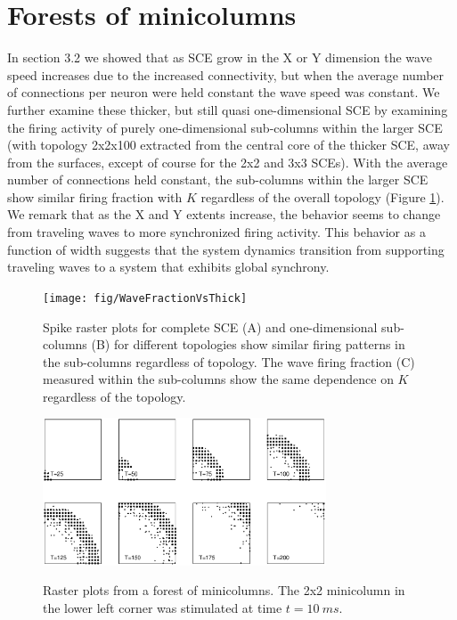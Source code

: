 \FloatBarrier
\section{Forests of minicolumns}
In section 3.2 we showed that as SCE grow in the X or Y dimension the wave speed increases due to the increased connectivity, but when the average number of connections per neuron were held constant the wave speed was constant.
We further examine these thicker, but still quasi one-dimensional SCE by examining the firing activity of purely one-dimensional sub-columns within the larger SCE (with topology 2x2x100 extracted from the central core of the thicker SCE, away from the surfaces, except of course for the 2x2 and 3x3 SCEs).
With the average number of connections held constant, the sub-columns within the larger SCE show similar firing fraction with $K$ regardless of the overall topology (Figure \ref{fig:LargeSCESubcolumns}).
We remark that as the X and Y extents increase, the behavior seems to change from traveling waves to more synchronized firing activity.
This behavior as a function of width suggests that the system dynamics transition from supporting traveling waves to a system that exhibits global synchrony.
\begin{figure}[!htb]
 \caption{ Spike raster plots for complete SCE (A) and one-dimensional sub-columns (B) for different topologies show similar firing patterns in the sub-columns regardless  of topology. 
           The wave firing fraction (C) measured within the sub-columns show the same dependence on $K$ regardless of the topology.}
   \texttt{[image: fig/WaveFractionVsThick]}
   \label{fig:LargeSCESubcolumns}
\end{figure}
\FloatBarrier


\begin{figure}[!htb]
 \caption{ Raster plots from a forest of minicolumns. The 2x2 minicolumn in the lower left corner was stimulated at time $t=10\ ms$.}
   \includegraphics[width=0.75\textwidth]{fig/Rasters_2_5D_Wave}
   \label{fig:2_5D_Wave}
\end{figure}


\FloatBarrier


\endinput
